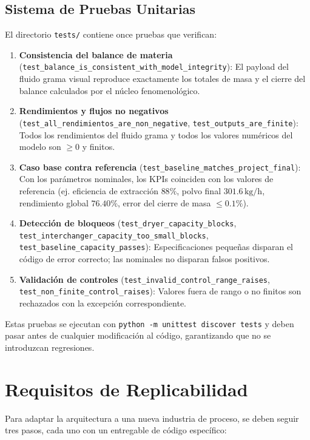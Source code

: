 \documentclass[10pt,letterpaper,twocolumn]{article}
\begin{document}
\subsection{Sistema de Pruebas Unitarias}

El directorio \texttt{tests/} contiene once pruebas que verifican:

\begin{enumerate}
    \item \textbf{Consistencia del balance de materia} (\texttt{test\_balance\_is\_consistent\_with\_model\_integrity}): El payload del fluido grama visual reproduce exactamente los totales de masa y el cierre del balance calculados por el núcleo fenomenológico.
    \item \textbf{Rendimientos y flujos no negativos} (\texttt{test\_all\_rendimientos\_are\_non\_negative}, \texttt{test\_outputs\_are\_finite}): Todos los rendimientos del fluido grama y todos los valores numéricos del modelo son $\geq 0$ y finitos.
    \item \textbf{Caso base contra referencia} (\texttt{test\_baseline\_matches\_project\_final}): Con los parámetros nominales, los KPIs coinciden con los valores de referencia (ej. eficiencia de extracción $88\%$, polvo final $301.6\,\text{kg/h}$, rendimiento global $76.40\%$, error del cierre de masa $\leq 0.1\%$).
    \item \textbf{Detección de bloqueos} (\texttt{test\_dryer\_capacity\_blocks}, \texttt{test\_interchanger\_capacity\_too\_small\_blocks}, \texttt{test\_baseline\_capacity\_passes}): Especificaciones pequeñas disparan el código de error correcto; las nominales no disparan falsos positivos.
    \item \textbf{Validación de controles} (\texttt{test\_invalid\_control\_range\_raises}, \texttt{test\_non\_finite\_control\_raises}): Valores fuera de rango o no finitos son rechazados con la excepción correspondiente.
\end{enumerate}

Estas pruebas se ejecutan con \texttt{python -m unittest discover tests} y deben pasar antes de cualquier modificación al código, garantizando que no se introduzcan regresiones.

\section{Requisitos de Replicabilidad}

Para adaptar la arquitectura a una nueva industria de proceso, se deben seguir tres pasos, cada uno con un entregable de código específico:
\end{document}
